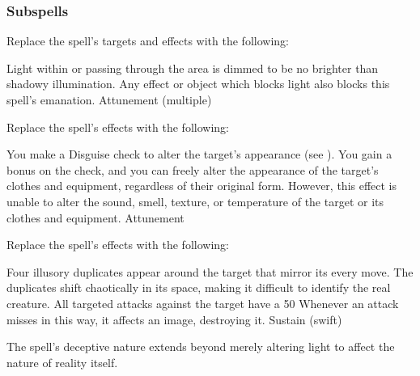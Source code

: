 \subsubsection{Subspells}
Replace the spell's targets and effects with the following:
\begin{spellcontent}
\begin{augmenttargetinginfo}
\end{augmenttargetinginfo}
\begin{augmenteffects}
\spelleffect
Light within or passing through the area is dimmed to be no brighter than shadowy illumination.
Any effect or object which blocks light also blocks this spell's emanation.
\spelldur Attunement (multiple)
\end{augmenteffects}
\end{spellcontent}
Replace the spell's effects with the following:
\begin{spellcontent}
\begin{augmenteffects}
\spelleffect
You make a Disguise check to alter the target's appearance (see ).
You gain a  bonus on the check, and you can freely alter the appearance of the target's clothes and equipment, regardless of their original form.
However, this effect is unable to alter the sound, smell, texture, or temperature of the target or its clothes and equipment.
\spelldur Attunement
\end{augmenteffects}
\end{spellcontent}
Replace the spell's effects with the following:
\begin{spellcontent}
\begin{augmenteffects}
\spelleffect
Four illusory duplicates appear around the target that mirror its every move.
The duplicates shift chaotically in its space, making it difficult to identify the real creature.
All targeted attacks against the target have a 50%
Whenever an attack misses in this way, it affects an image, destroying it.
\spelldur Sustain (swift)
\end{augmenteffects}
\end{spellcontent}
The spell's deceptive nature extends beyond merely altering light to affect the nature of reality itself.
